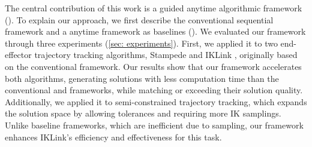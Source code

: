 The central contribution of this work is a guided anytime algorithmic framework (). To explain our approach, we first describe the conventional sequential framework and a \naive anytime framework as baselines ().
We evaluated our framework through three experiments (\cref{sec: experiments}). First, we applied it to two end-effector trajectory tracking algorithms, Stampede \cite{rakita2019stampede} and IKLink \cite{wang2024iklink}, originally based on the conventional framework. Our results show that our framework accelerates both algorithms, generating solutions with less computation time than the conventional and \naive frameworks, while matching or exceeding their solution quality.
Additionally, we applied it to semi-constrained trajectory tracking, which expands the solution space by allowing tolerances and requiring more IK samplings. Unlike baseline frameworks, which are inefficient due to \naive sampling, our framework enhances IKLink's efficiency and effectiveness for this task.



